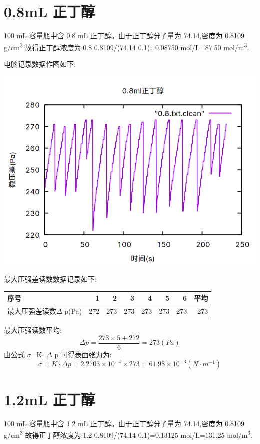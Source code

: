 \documentclass[11pt]{report}
\begin{document}
\section{0.8mL 正丁醇}
\label{sec:orgb751a0b}
    100 mL 容量瓶中含 0.8 mL 正丁醇。由于正丁醇分子量为 74.14,密度为 0.8109 g/cm\textsuperscript{3}
故得正丁醇浓度为:0.8\texttimes{} 0.8109/(74.14\texttimes{} 0.1)=0.08750 mol/L=87.50 mol/m\textsuperscript{3}.

电脑记录数据作图如下:
\begin{center}
\includegraphics[width=.9\linewidth]{../img/0.8.png}
\end{center}

最大压强差读数数据记录如下:
\begin{center}
\begin{tabular}{lrrrrrrr}
序号 & 1 & 2 & 3 & 4 & 5 & 6 & 平均\\
\hline
最大压强差读数\(\Delta\) p(Pa) & 272 & 273 & 273 & 273 & 273 & 273 & 273\\
\end{tabular}
\end{center}

最大压强读数平均:
\[
    \Delta p =\frac{273\times 5 + 272}{6}=273(Pa)
    \]
由公式 \(\sigma\)=K\(\cdot\) \(\Delta\) p 可得表面张力为:
\[
    \sigma=K\cdot \Delta p=2.2703\times 10^{-4}\times 273=61.98\times 10^{-3}(N\cdot m^{-1})
    \]

\section{1.2mL 正丁醇}
\label{sec:orgd4cf7a9}
    100 mL 容量瓶中含 1.2 mL 正丁醇。由于正丁醇分子量为 74.14,密度为 0.8109 g/cm\textsuperscript{3}
故得正丁醇浓度为:1.2\texttimes{} 0.8109/(74.14\texttimes{} 0.1)=0.13125 mol/L=131.25 mol/m\textsuperscript{3}.
\end{document}
